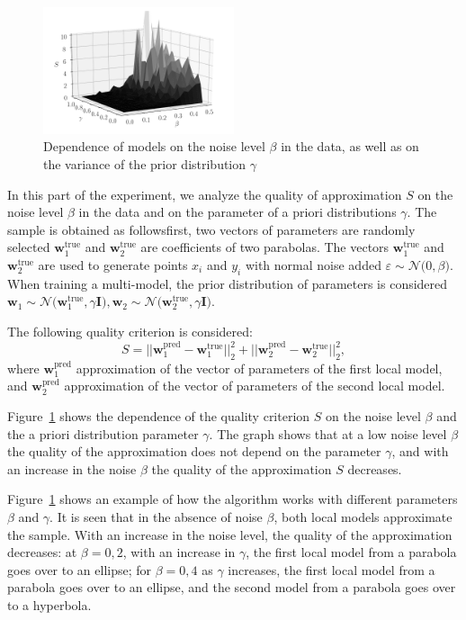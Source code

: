 \begin{figure}[h!t]
\includegraphics[width=0.5\textwidth]{results/priorexpertfig/3dplot}
\caption{Dependence of models on the noise level $\beta$ in the data, as well as on the variance of the prior distribution $\gamma$}
\label{ce:fig5}
\end{figure}
In this part of the experiment, we analyze the quality of approximation $S$ on the noise level $\beta$ in the data and on the parameter of a priori distributions $\gamma$. The sample is obtained as followsfirst, two vectors of parameters are randomly selected $\mathbf{w}^\text{true}_{1}$ and $\mathbf{w}^\text{true}_{2}$ are  coefficients of two parabolas. The vectors $\mathbf {w}^\text {true}_{1} $ and $\mathbf{w}^\text {true}_{2} $ are used to generate points $x_i$ and $y_i$ with normal noise added $\varepsilon\sim\mathcal {N} \bigr(0,\beta\bigr)$. When training a multi-model, the prior distribution of parameters is considered $\mathbf{w}_1\sim\mathcal{N}\bigr(\mathbf{w}^\text{true}_{1}, \gamma\mathbf{I}\bigr),\mathbf{w}_2\sim\mathcal{N}\bigr(\mathbf{w}^\text{true}_{2}, \gamma\mathbf{I}\bigr)$.

The following quality criterion is considered:
\[
S = ||\mathbf{w}^\text{pred}_{1} - \mathbf{w}^\text{true}_{1}||^{2}_{2} + ||\mathbf{w}^\text{pred}_{2} - \mathbf{w}^\text{true}_{2}||^{2}_{2},
\]
where $\mathbf{w}^\text{pred}_{1}$ approximation of the vector of parameters of the first local model, and $\mathbf{w}^\text{pred}_{2}$ approximation of the vector of parameters of the second local model.

Figure~\ref{ce:fig5} shows the dependence of the quality criterion $S$ on the noise level $\beta$ and the a priori distribution parameter $\gamma$. The graph shows that at a low noise level $\beta$ the quality of the approximation does not depend on the parameter $\gamma $, and with an increase in the noise $\beta $ the quality of the approximation $S$ decreases.

Figure~\ref{ce:fig5} shows an example of how the algorithm works with different parameters $\beta$ and $\gamma$. It is seen that in the absence of noise $\beta$, both local models approximate the sample. With an increase in the noise level, the quality of the approximation decreases: at $\beta = 0 {,}2$, with an increase in $\gamma$, the first local model from a parabola goes over to an ellipse; for $\beta=0 {,}4$ as $\gamma$ increases, the first local model from a parabola goes over to an ellipse, and the second model from a parabola goes over to a hyperbola.

